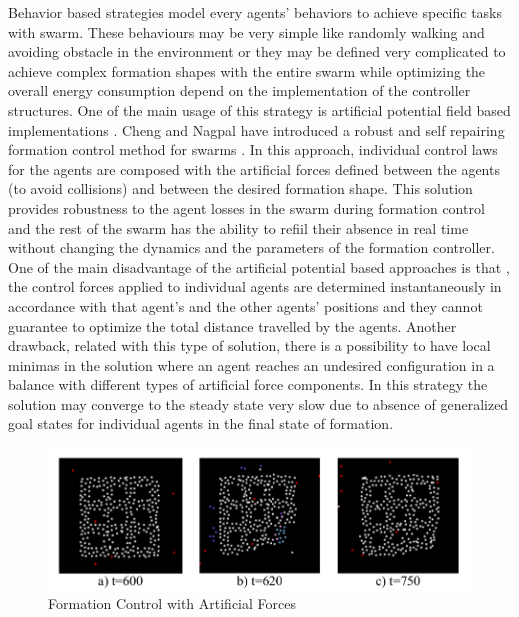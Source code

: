 Behavior based strategies model every agents' behaviors to achieve specific tasks with swarm. These behaviours may be very simple like randomly walking and avoiding obstacle in the environment or they may be defined very complicated to achieve complex formation shapes with the entire swarm while optimizing the overall energy consumption depend on the implementation of the controller structures.  One of the main usage of this strategy is artificial potential field based implementations . Cheng and Nagpal have introduced a robust and self repairing formation control method for swarms \cite{24}. In this approach, individual control laws for the agents are composed with the artificial forces defined between the agents (to avoid collisions) and between the desired formation shape. This solution provides robustness to the agent losses in the swarm during formation control and the rest of the swarm has the ability to refiil their absence in real time without changing the dynamics and the parameters of the formation controller. One of the main disadvantage of the artificial potential based approaches is that , the control forces applied to individual agents are determined instantaneously in accordance with that agent's and the other agents' positions and they cannot guarantee to optimize the total distance travelled by the agents. Another drawback, related with this type of solution, there is a possibility to have local minimas in the solution where an agent reaches an undesired configuration in a balance with different types of artificial force components. In this strategy the solution may converge to the steady state very slow due to absence of generalized goal states for individual agents in the final state of formation. 

\begin{figure}[H]
	\caption{Formation Control with Artificial Forces \cite{24}}
	\centering
	\includegraphics[scale = 0.4]{potential}
\end{figure}



